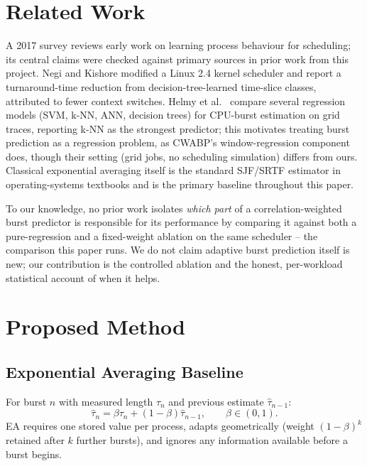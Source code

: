 \documentclass[10pt,twocolumn]{article}
\begin{document}
\section{Related Work}
A 2017 survey \cite{dias2017} reviews early work on learning process behaviour for scheduling; its central claims were checked against primary sources in prior work from this project. Negi and Kishore \cite{negi2005} modified a Linux 2.4 kernel scheduler and report a turnaround-time reduction from decision-tree-learned time-slice classes, attributed to fewer context switches. Helmy et al.\ \cite{helmy2015} compare several regression models (SVM, k-NN, ANN, decision trees) for CPU-burst estimation on grid traces, reporting k-NN as the strongest predictor; this motivates treating burst prediction as a regression problem, as CWABP's window-regression component does, though their setting (grid jobs, no scheduling simulation) differs from ours. Classical exponential averaging itself is the standard SJF/SRTF estimator in operating-systems textbooks \cite{silberschatz2013} and is the primary baseline throughout this paper.

To our knowledge, no prior work isolates \emph{which part} of a correlation-weighted burst predictor is responsible for its performance by comparing it against both a pure-regression and a fixed-weight ablation on the same scheduler -- the comparison this paper runs. We do not claim adaptive burst prediction itself is new; our contribution is the controlled ablation and the honest, per-workload statistical account of when it helps.

\section{Proposed Method}

\subsection{Exponential Averaging Baseline}
For burst $n$ with measured length $\tau_n$ and previous estimate $\hat\tau_{n-1}$:
\begin{equation}
\hat\tau_n = \beta\tau_n + (1-\beta)\hat\tau_{n-1}, \qquad \beta\in(0,1).
\label{eq:ea}
\end{equation}
EA requires one stored value per process, adapts geometrically (weight $(1-\beta)^k$ retained after $k$ further bursts), and ignores any information available before a burst begins.
\end{document}
